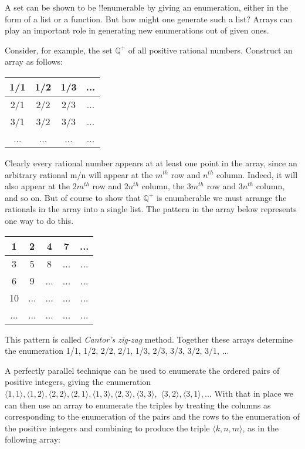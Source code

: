 \documentclass[../../include/open-logic-section]{subfiles}
\begin{document}

A set can be shown to be !!{enumerable} by giving an enumeration, either in
the form of a list or a function. But how might one generate such a list?
Arrays can play an important role in generating new enumerations out of
given ones.

Consider, for example, the set $\mathbb{Q}^{+}$ of all positive rational
numbers. Construct an array as follows:

\begin{tabular}{c|c|c|c} 
1/1 & 1/2 & 1/3 & ... \\\hline
2/1 & 2/2 & 2/3 & ... \\\hline
3/1 & 3/2 & 3/3 & ... \\\hline
... & ... & ... & ... \\
\end{tabular}

Clearly every rational number appears at at least one point in the array,
since an arbitrary rational m/n will appear at the $m^{th}$ row and $n^{th}$
column. Indeed, it will also appear at the $2m^{th}$ row and $2n^{th}$ column,
the $3m^{th}$ row and $3n^{th}$ column, and so on. But of course to show that
$\mathbb{Q}^{+}$ is enumberable we must arrange the rationals in the array
into a single list. The pattern in the array below represents one way to do
this.

\begin{tabular}{c|c|c|c|c} 
1 & 2 & 4 & 7 &  ... \\\hline
3 & 5 & 8 &  ...& ... \\\hline
6 & 9 &  ... & ... & ... \\\hline
10&  ... & ...& ... & ... \\\hline
... & ... & ... & ... & ...\\
\end{tabular}

This pattern is called \emph{Cantor's zig-zag} method. Together these
arrays determine the enumeration 1/1, 1/2, 2/2, 2/1, 1/3, 2/3, 3/3, 3/2,
3/1, ...

A perfectly parallel technique can be used to enumerate the ordered pairs
of positive integers, giving the enumeration $\langle1,1\rangle,
\langle1,2\rangle, \langle2,2\rangle, \langle2,1\rangle, \langle1,3\rangle,
\langle2,3\rangle, \langle3,3\rangle,$ $\langle3,2\rangle,
\langle3,1\rangle, ...$ With that in place we can then use an array to
enumerate the triples by treating the columns as corresponding to the
enumeration of the pairs and the rows to the enumeration of the positive
integers and combining to produce the triple $\langle k,n,m\rangle$, as in
the following array:
\end{document}

